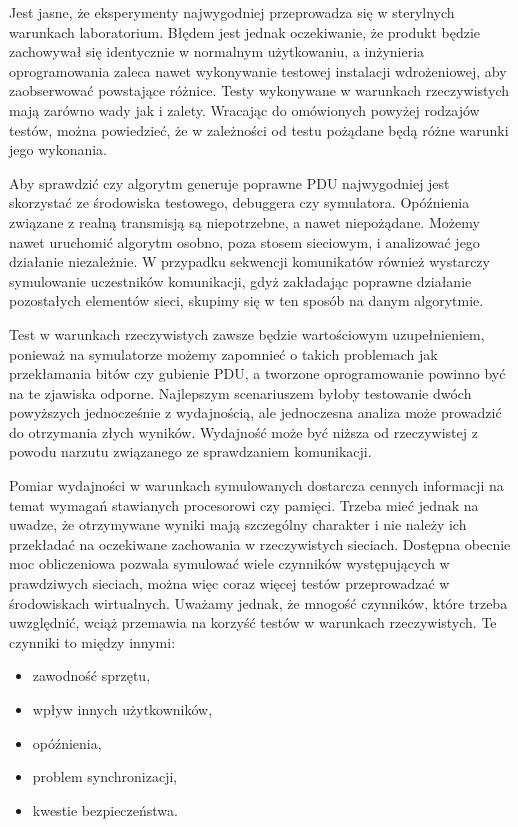 \documentclass[00-praca-magisterska.tex]{subfiles}
\begin{document}
Jest jasne, że eksperymenty najwygodniej przeprowadza się w sterylnych
warunkach laboratorium. Błędem jest jednak oczekiwanie, że produkt będzie
zachowywał się identycznie w normalnym użytkowaniu, a inżynieria oprogramowania
zaleca nawet wykonywanie testowej instalacji wdrożeniowej, aby zaobserwować
powstające różnice. Testy wykonywane w warunkach rzeczywistych mają zarówno
wady jak i zalety.  Wracając do omówionych powyżej rodzajów testów, można
powiedzieć, że w zależności od testu pożądane będą różne warunki jego
wykonania.

Aby sprawdzić czy algorytm generuje poprawne PDU najwygodniej jest skorzystać
ze środowiska testowego, debuggera czy symulatora. Opóźnienia związane z realną
transmisją są niepotrzebne, a nawet niepożądane. Możemy nawet uruchomić
algorytm osobno, poza stosem sieciowym, i analizować jego działanie
niezależnie. W przypadku sekwencji komunikatów również wystarczy symulowanie
uczestników komunikacji, gdyż zakładając poprawne działanie pozostałych
elementów sieci, skupimy się w ten sposób na danym algorytmie.

Test w warunkach rzeczywistych zawsze będzie wartościowym uzupełnieniem,
ponieważ na symulatorze możemy zapomnieć o takich problemach jak przekłamania
bitów czy gubienie PDU, a tworzone oprogramowanie powinno być na te zjawiska
odporne. Najlepszym scenariuszem byłoby testowanie dwóch powyższych
jednocześnie z wydajnością, ale jednoczesna analiza może prowadzić do
otrzymania złych wyników. Wydajność może być niższa od rzeczywistej z powodu
narzutu związanego ze sprawdzaniem komunikacji.

Pomiar wydajności w warunkach symulowanych dostarcza cennych informacji na
temat wymagań stawianych procesorowi czy pamięci. Trzeba mieć jednak na uwadze,
że otrzymywane wyniki mają szczególny charakter i nie należy ich przekładać na
oczekiwane zachowania w rzeczywistych sieciach. Dostępna obecnie moc
obliczeniowa pozwala symulować wiele czynników występujących w prawdziwych
sieciach, można więc coraz więcej testów przeprowadzać w środowiskach
wirtualnych. Uważamy jednak, że mnogość czynników, które trzeba uwzględnić,
wciąż przemawia na korzyść testów w warunkach rzeczywistych. Te czynniki to
między innymi:
\begin{itemize}
\item zawodność sprzętu,
\item wpływ innych użytkowników,
\item opóźnienia,
\item problem synchronizacji,
\item kwestie bezpieczeństwa.
\end{itemize}
\end{document}
